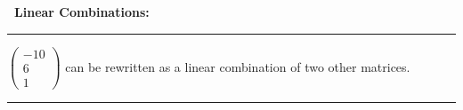 \documentclass{article}
\newenvironment{explanation}[1]
    {
\par\medskip\textbf{~#1:}\bigskip
    \hrule
    \rmfamily\medskip
    }
    {
    \bigskip
    \hrule
    \medskip
    }
\begin{document}
\begin{explanation}{Linear Combinations}
    $\begin{pmatrix} -10 \\ 6 \\ 1 \end{pmatrix}$ can be rewritten as a linear combination of two other matrices.
\end{explanation}
\end{document}
